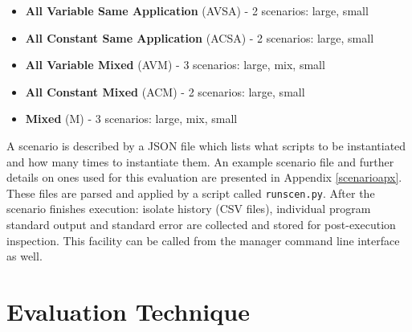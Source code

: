 \documentclass{l4proj}
\begin{document}
\begin{itemize}
\item \textbf{All Variable Same Application} (AVSA) - 2 scenarios: large, small
\item \textbf{All Constant Same Application} (ACSA) - 2 scenarios: large, small
\item \textbf{All Variable Mixed} (AVM) - 3 scenarios: large, mix, small 
\item \textbf{All Constant Mixed} (ACM) - 2 scenarios: large, small
\item \textbf{Mixed} (M) - 3 scenarios: large, mix, small
\end{itemize}
\hspace*{1em} A scenario is described by a JSON file which lists what scripts to be instantiated and how many times to instantiate them. An example scenario file and further details on ones used for this evaluation are presented in Appendix \ref{scenarioapx}. These files are parsed and applied by a script called \texttt{runscen.py}. After the scenario finishes execution: isolate history (CSV files), individual program standard output and standard error are collected and stored for post-execution inspection. This facility can be called from the manager command line interface as well.

\section{Evaluation Technique}
\end{document}
